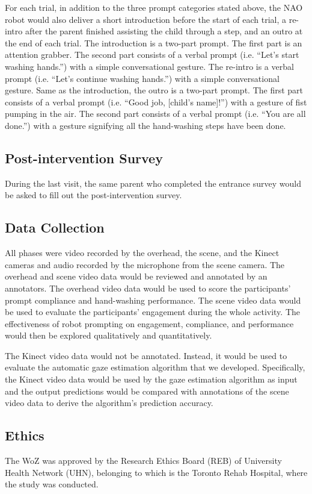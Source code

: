 \documentclass{ut-thesis}
\begin{document}
For each trial, in addition to the three prompt categories stated above, the NAO robot would also deliver a short introduction before the start of each trial, a re-intro after the parent finished assisting the child through a step, and an outro at the end of each trial. The introduction is a two-part prompt. The first part is an attention grabber. The second part consists of a verbal prompt (i.e. “Let's start washing hands.”) with a simple conversational gesture. The re-intro is a verbal prompt (i.e. “Let's continue washing hands.”) with a simple conversational gesture. Same as the introduction, the outro is a two-part prompt. The first part consists of a verbal prompt (i.e. “Good job, [child's name]!”) with a gesture of fist pumping in the air. The second part consists of a verbal prompt (i.e. “You are all done.”) with a gesture signifying all the hand-washing steps have been done.

\subsection{Post-intervention Survey}
During the last visit, the same parent who completed the entrance survey would be asked to fill out the post-intervention survey.

\subsection{Data Collection}
All phases were video recorded by the overhead, the scene, and the Kinect cameras and audio recorded by the microphone from the scene camera.  The overhead and scene video data would be reviewed and annotated by an annotators. The overhead video data would be used to score the participants' prompt compliance and hand-washing performance. The scene video data would be used to evaluate the participants' engagement during the whole activity. The effectiveness of robot prompting on engagement, compliance, and performance would then be explored qualitatively and quantitatively.

The Kinect video data would not be annotated. Instead, it would be used to evaluate the automatic gaze estimation algorithm that we developed. Specifically, the Kinect video data would be used by the gaze estimation algorithm as input and the output predictions would be compared with annotations of the scene video data to derive the algorithm's prediction accuracy.



\subsection{Ethics}
The WoZ was approved by the Research Ethics Board (REB) of University Health Network (UHN), belonging to which is the Toronto Rehab Hospital, where the study was conducted.
\end{document}
